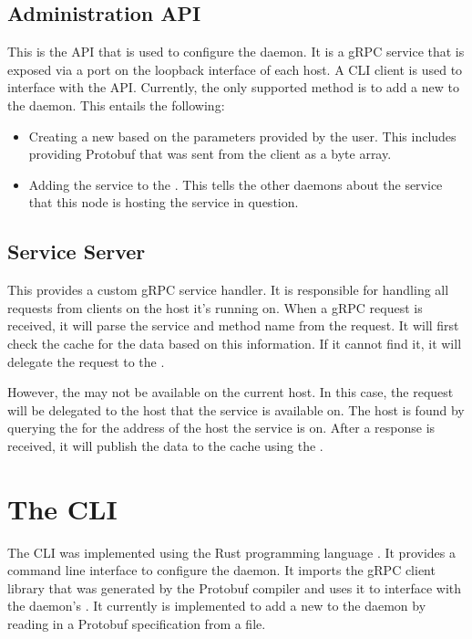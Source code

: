 \documentclass[a4paper]{article}
\begin{document}
\subsection{Administration API}
\label{sec:api}
This is the API that is used to configure the daemon. It is a gRPC service that is exposed via a port on the loopback interface of each host.
A CLI client is used to interface with the API. Currently, the only supported method is to add a new \textit{} to the daemon.
This entails the following:
\begin{itemize}
    \item Creating a new \textit{} based on the parameters provided by the user.
          This includes providing Protobuf that was sent from the client as a byte array.
    \item Adding the service to the \textit{}. This tells the other daemons about the service that this
          node is hosting the service in question.
\end{itemize}

\subsection{Service Server}
\label{sec:server}
This provides a custom gRPC service handler. It is responsible for handling all requests from clients on the host it's running on.
When a gRPC request is received, it will parse the service and method name from the request.
It will first check the cache for the data based on this information. If it cannot find it,
it will delegate the request to the \textit{}.

However, the \textit{} may not be available on the current host. In this case, the request will be delegated to the host that the
service is available on. The host is found by querying the \textit{} for the address of the host the service is on.
After a response is received, it will publish the data to the cache using the \textit{}.

\section{The CLI}
\label{sec:cli}
The CLI was implemented using the Rust programming language \cite{rust}.
It provides a command line interface to configure the daemon.
It imports the gRPC client library that was generated by the Protobuf compiler and uses it to interface with the daemon's \textit{}.
It currently is implemented to add a new \textit{} to the daemon by reading in a Protobuf specification from a file.
\end{document}
